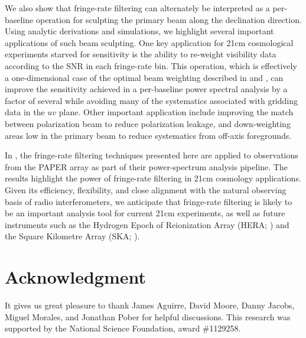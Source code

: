 \documentclass[twocolumn,apj,numberedappendix]{emulateapj}
\begin{document}
We also show that fringe-rate filtering can alternately be interpreted as a per-baseline
operation for sculpting the primary beam along the declination direction.  Using analytic
derivations and simulations, we highlight several important applications of such beam
sculpting.  One key application for 21cm cosmological experiments starved for sensitivity
is the ability to re-weight visibility data according to the SNR in each fringe-rate bin.
This operation, which is effectively a one-dimensional case of the optimal beam
weighting described in \citet{morales_matejek2009} and \citet{bhatnagar_et_al2008}, 
can improve the sensitivity achieved in a per-baseline power spectral analysis by a factor
of several %
while avoiding many of the systematics associated with gridding data in the $uv$ plane.
Other important application include improving the match between polarization beam to
reduce polarization leakage, and down-weighting areas low in the primary beam
to reduce systematics from off-axis foregrounds.

In \citet{ali_et_al2015}, the fringe-rate filtering techniques presented here are applied to
observations from the PAPER array as part of their power-spectrum analysis pipeline.  The
results highlight the power of fringe-rate filtering in 21cm cosmology applications.
Given its efficiency, flexibility, and close alignment with the natural observing
basis of radio interferometers, we anticipate that fringe-rate filtering is likely to be
an important analysis tool for current 21cm experiments, as well as future instruments
such as the Hydrogen Epoch of Reionization Array (HERA; \citealt{pober_et_al2014}) and
the Square Kilometre Array (SKA; \citealt{XXX}).


\section{Acknowledgment}

It gives us great pleasure to thank James Aguirre, David Moore, Danny Jacobs, 
Miguel Morales, and Jonathan Pober for helpful discussions.  This research
was supported by the National Science Foundation, award \#1129258.




\end{document}
